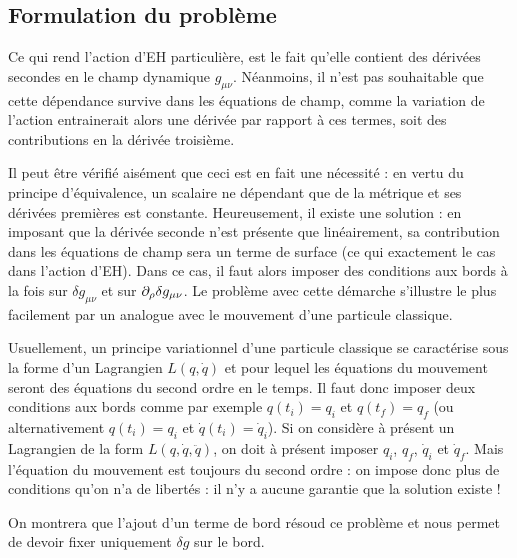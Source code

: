 \subsection{Formulation du problème}
Ce qui rend l'action d'EH particulière, est le fait qu'elle contient des dérivées secondes en le champ dynamique $g_{\mu\nu}$. Néanmoins, il n'est pas souhaitable que cette dépendance survive dans les équations de champ, comme la variation de l'action entrainerait alors une dérivée par rapport à ces termes, soit des contributions en la dérivée troisième. 

Il peut être vérifié aisément que ceci est en fait une nécessité : en vertu du principe d'équivalence, un scalaire ne dépendant que de la métrique et ses dérivées premières est constante. Heureusement, il existe une solution : en imposant que la dérivée seconde n'est présente que linéairement, sa contribution dans les équations de champ sera un terme de surface (ce qui exactement le cas dans l'action d'EH). Dans ce cas, il faut alors imposer des conditions aux bords à la fois sur $\delta g_{\mu\nu}$ et sur $\partial_\rho \delta g_{\mu\nu}$. Le problème avec cette démarche s'illustre le plus facilement par un analogue avec le mouvement d'une particule classique.
\begin{exmp}
    Usuellement, un principe variationnel d'une particule classique se caractérise sous la forme d'un Lagrangien $L(q,\dot{q})$ et pour lequel les équations du mouvement seront des équations du second ordre en le temps. Il faut donc imposer deux conditions aux bords comme par exemple $q(t_i) = q_i$ et $q(t_f) = q_f$ (ou alternativement $q(t_i) = q_i$ et $\dot{q}(t_i) = \dot{q}_i$). Si on considère à présent un Lagrangien de la form $L(q,\dot{q},\ddot{q})$, on doit à présent imposer $q_i$, $q_f$, $\dot{q}_i$ et $\dot{q}_f$. Mais l'équation du mouvement est toujours du second ordre : on impose donc plus de conditions qu'on n'a de libertés : il n'y a aucune garantie que la solution existe !
\end{exmp}
On montrera que l'ajout d'un terme de bord résoud ce problème et nous permet de devoir fixer uniquement $\delta g$ sur le bord.
